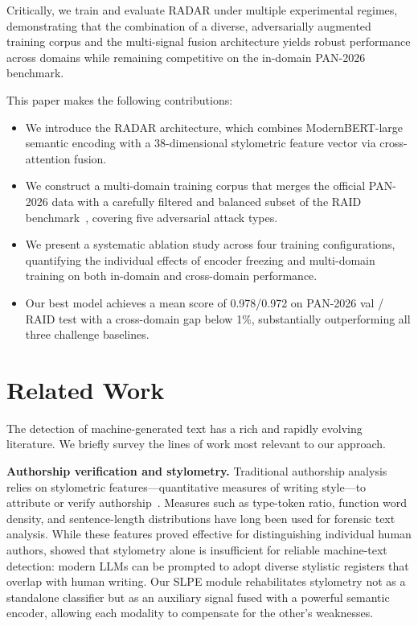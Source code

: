 \documentclass[]{ceurart}
\begin{document}
Critically, we train and evaluate RADAR under multiple experimental regimes, demonstrating that the combination of a diverse, adversarially augmented training corpus and the multi-signal fusion architecture yields robust performance across domains while remaining competitive on the in-domain PAN-2026 benchmark.

This paper makes the following contributions:
\begin{itemize}
  \item We introduce the RADAR architecture, which combines ModernBERT-large semantic encoding with a 38-dimensional stylometric feature vector via cross-attention fusion.
  \item We construct a multi-domain training corpus that merges the official PAN-2026 data with a carefully filtered and balanced subset of the RAID benchmark~\cite{dugan:2024}, covering five adversarial attack types.
  \item We present a systematic ablation study across four training configurations, quantifying the individual effects of encoder freezing and multi-domain training on both in-domain and cross-domain performance.
  \item Our best model achieves a mean score of 0.978/0.972 on PAN-2026 val / RAID test with a cross-domain gap below 1\%, substantially outperforming all three challenge baselines.
\end{itemize}


\section{Related Work}

The detection of machine-generated text has a rich and rapidly evolving literature. We briefly survey the lines of work most relevant to our approach.

\textbf{Authorship verification and stylometry.}
Traditional authorship analysis relies on stylometric features—quantitative measures of writing style—to attribute or verify authorship~\cite{koppel:2004}. Measures such as type-token ratio, function word density, and sentence-length distributions have long been used for forensic text analysis. While these features proved effective for distinguishing individual human authors, \citet{schuster:2020} showed that stylometry alone is insufficient for reliable machine-text detection: modern LLMs can be prompted to adopt diverse stylistic registers that overlap with human writing. Our SLPE module rehabilitates stylometry not as a standalone classifier but as an auxiliary signal fused with a powerful semantic encoder, allowing each modality to compensate for the other's weaknesses.
\end{document}
